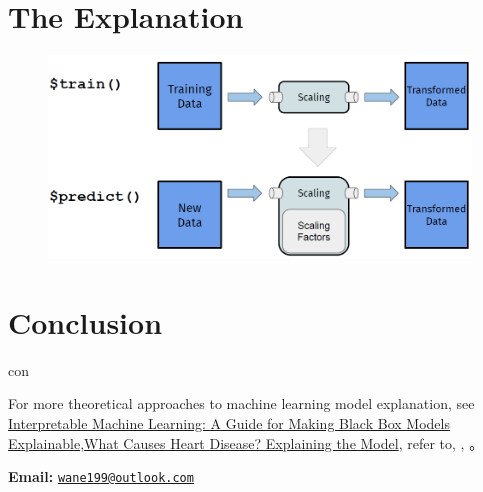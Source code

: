 \documentclass[
  11pt,
  ignorenonframetext,
  fontset=fandol]{beamer}
\begin{document}
\hypertarget{the-explanation}{%
\section{The Explanation}\label{the-explanation}}

\begin{frame}{}
\protect\hypertarget{section}{}
\begin{figure}

{\centering \includegraphics[width=0.75\linewidth]{images/feature_engineering} 

}

\end{figure}
\end{frame}

\hypertarget{conclusion}{%
\section{Conclusion}\label{conclusion}}

\begin{frame}{con}
\protect\hypertarget{con}{}
\end{frame}

\begin{frame}{}
\protect\hypertarget{section-1}{}
For more theoretical approaches to machine learning model explanation,
see
\href{https://christophm.github.io/interpretable-ml-book/}{Interpretable
Machine Learning: A Guide for Making Black Box Models
Explainable},\href{https://www.kaggle.com/code/tentotheminus9/what-causes-heart-disease-explaining-the-model/notebook}{What
Causes Heart Disease? Explaining the Model}, refer
to\citep{rajpurkar2021deep}, \citep{mlr3book}, \citep{molnar2022}。

\bigskip

\textbf{Email:}
\href{mailto:wane199@outlook.com}{\nolinkurl{wane199@outlook.com}}
\end{frame}
\end{document}

